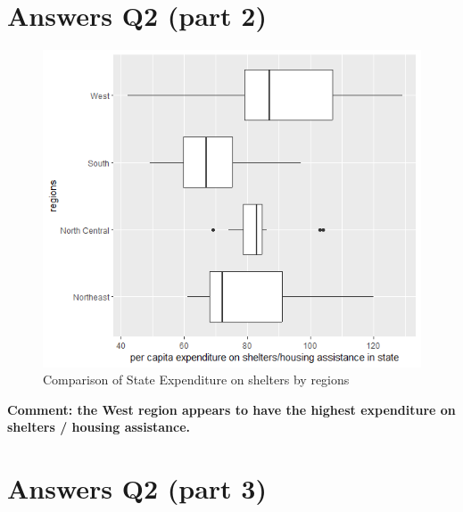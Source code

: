 \documentclass[12pt,letterpaper]{article}
\begin{document}
\newpage

\section*{Answers Q2 (part 2)}

\begin{figure}[H] %
	
	\centering
	\includegraphics[scale=1.0]{Rplot_box_2.png}
	\caption{Comparison of State Expenditure on shelters by regions}
	\label{fig: boxplot}
	\newpage
\end{figure} 


\noindent  \textbf {Comment: the West region appears to have the highest expenditure on shelters / housing assistance.}


\newpage

\section*{Answers Q2 (part 3)}
\end{document}
